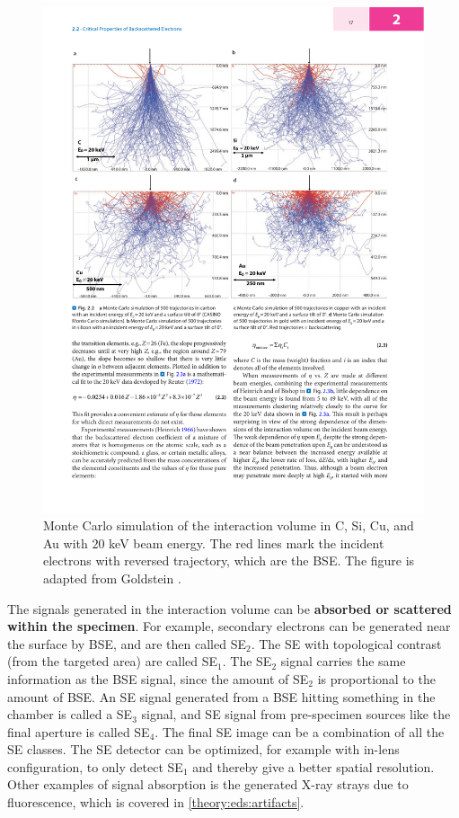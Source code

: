 \begin{figure}[ht]
    \centering
    \includegraphics[width=0.8\linewidth]{figures/SEM_montecarlo_BSE.pdf}
    \caption{
        Monte Carlo simulation of the interaction volume in C, Si, Cu, and Au with $20$ keV beam energy.
        The red lines mark the incident electrons with reversed trajectory, which are the BSE.
        The figure is adapted from Goldstein \cite[Fig. 2.2]{goldstein_scanning_2018}.
    }
    \label{fig:montecarlo_BSE}
\end{figure}


The signals generated in the interaction volume can be \textbf{absorbed or scattered within the specimen}.
For example, secondary electrons can be generated near the surface by BSE, and are then called SE$_2$.
The SE with topological contrast (from the targeted area) are called SE$_1$.
The SE$_2$ signal carries the same information as the BSE signal, since the amount of SE$_2$ is proportional to the amount of BSE.
An SE signal generated from a BSE hitting something in the chamber is called a SE$_3$ signal, and SE signal from pre-specimen sources like the final aperture is called SE$_4$.
The final SE image can be a combination of all the SE classes.
The SE detector can be optimized, for example with  in-lens configuration, to only detect SE$_1$ and thereby give a better spatial resolution.
Other examples of signal absorption is the generated X-ray strays due to fluorescence, which is covered in \cref{theory:eds:artifacts}.


